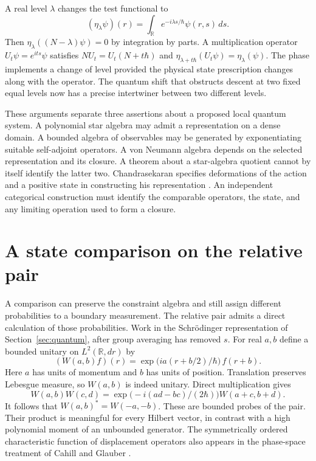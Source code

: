 \documentclass[11pt,letterpaper]{article}
\newcommand{\RR}{\mathbb R}
\begin{document}
A real level $\lambda$ changes the test functional to
\[
 (\eta_\lambda\psi)(r)=\int_{\RR} e^{-i\lambda s/\hbar}\psi(r,s)\,ds .
\]
Then $\eta_\lambda((N-\lambda)\psi)=0$ by integration by parts. A multiplication operator
$U_t\psi=e^{its}\psi$ satisfies $N U_t=U_t(N+t\hbar)$ and
$\eta_{\lambda+t\hbar}(U_t\psi)=\eta_\lambda(\psi)$. The phase implements a change of level
provided the physical state prescription changes along with the operator. The quantum shift
that obstructs descent at two fixed equal levels now has a precise intertwiner between two
different levels.

These arguments separate three assertions about a proposed local quantum system. A polynomial
star algebra may admit a representation on a dense domain. A bounded algebra of observables
may be generated by exponentiating suitable self-adjoint operators. A von Neumann algebra
depends on the selected representation and its closure. A theorem about a star-algebra
quotient cannot by itself identify the latter two. Chandrasekaran specifies deformations of
the action and a positive state in constructing his representation \cite[\S\S4.1, 4.2]{nc}. An
independent categorical construction must identify the comparable operators, the state, and
any limiting operation used to form a closure.

\section{A state comparison on the relative pair}
\label{sec:states}
A comparison can preserve the constraint algebra and still assign different probabilities to a
boundary measurement. The relative pair admits a direct calculation of those probabilities.
Work in the Schr\"odinger representation of Section~\ref{sec:quantum}, after group averaging
has removed $s$. For real $a,b$ define a bounded unitary on $L^2(\RR,dr)$ by
\begin{equation}
 (W(a,b)f)(r)=
 \exp\bigl(ia(r+b/2)/\hbar\bigr)\,f(r+b).
 \label{eq:displacement}
\end{equation}
Here $a$ has units of momentum and $b$ has units of position. Translation preserves Lebesgue
measure, so $W(a,b)$ is indeed unitary. Direct multiplication gives
\[
 W(a,b)W(c,d)=
 \exp\bigl(-i(ad-bc)/(2\hbar)\bigr)W(a+c,b+d).
\]
It follows that $W(a,b)^*=W(-a,-b)$. These are bounded probes of the pair. Their product is
meaningful for every Hilbert vector, in contrast with a high polynomial moment of an unbounded
generator. The symmetrically ordered characteristic function of displacement operators also
appears in the phase-space treatment of Cahill and Glauber \cite{cahill}.
\end{document}
